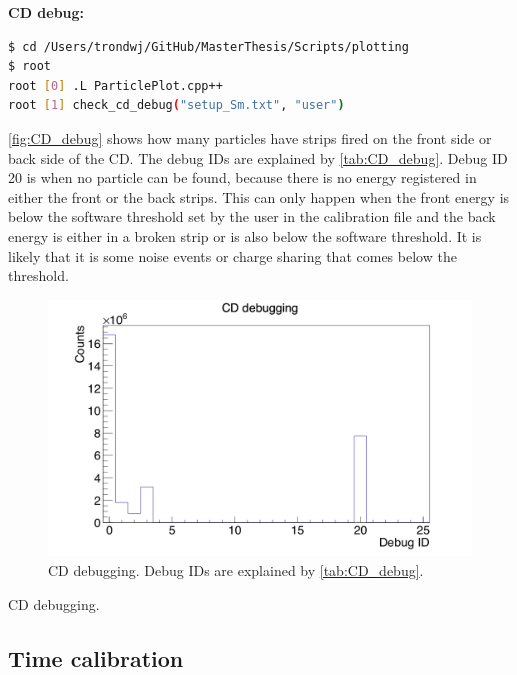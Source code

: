 \documentclass[twoside,english]{uiofysmaster/uiofysmaster}
\begin{document}
\textbf{CD debug:}

\begin{lstlisting}[language=sh]
$ cd /Users/trondwj/GitHub/MasterThesis/Scripts/plotting 
$ root
root [0] .L ParticlePlot.cpp++
root [1] check_cd_debug("setup_Sm.txt", "user")
\end{lstlisting}


\autoref{fig:CD_debug} shows how many particles have strips fired on the front side or back side of the CD. The debug IDs are explained by \autoref{tab:CD_debug}. Debug ID 20 is when no particle can be found, because there is no energy registered in either the front or the back strips. This can only happen when the front energy is below the software threshold set by the user in the calibration file and the back energy is either in a broken strip or is also below the software threshold. It is likely that it is some noise events or charge sharing that comes below the threshold. 


\begin{figure}[ht]
	\centering
	\includegraphics[width=\textwidth]{../Plots/plotting/cd_debug-user.png}
	\caption{CD debugging. Debug IDs are explained by \autoref{tab:CD_debug}. }
	\label{fig:CD_debug}
\end{figure}


\begin{table}[ht] 
	\centering 
	\caption{CD debugging.}
	
	\label{tab:CD_debug}
\end{table}




\subsection{Time calibration}
\end{document}
